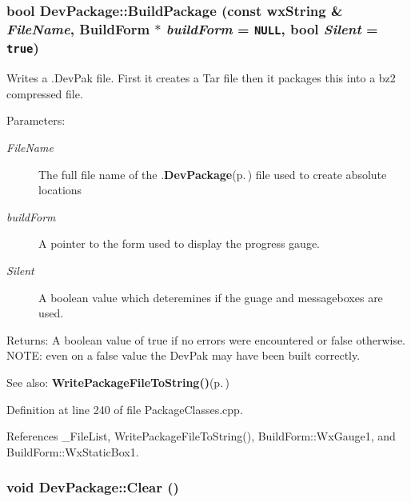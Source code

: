 \subsubsection{\setlength{\rightskip}{0pt plus 5cm}bool Dev\-Package::Build\-Package (const wx\-String \& {\em File\-Name}, {\bf Build\-Form} $\ast$ {\em build\-Form} = {\tt NULL}, bool {\em Silent} = {\tt true})}\label{class_dev_package_1fe849358b234bf36802aa17c9b5a165}


Writes a .Dev\-Pak file. First it creates a Tar file then it packages this into a bz2 compressed file. \begin{Desc}
\item[Parameters:]
\begin{description}
\item[{\em File\-Name}]The full file name of the .{\bf Dev\-Package}{\rm (p.\,\pageref{class_dev_package})} file used to create absolute locations \item[{\em build\-Form}]A pointer to the form used to display the progress gauge. \item[{\em Silent}]A boolean value which deteremines if the guage and messageboxes are used. \end{description}
\end{Desc}
\begin{Desc}
\item[Returns:]A boolean value of true if no errors were encountered or false otherwise. NOTE: even on a false value the Dev\-Pak may have been built correctly. \end{Desc}
\begin{Desc}
\item[See also:]{\bf Write\-Package\-File\-To\-String()}{\rm (p.\,\pageref{class_dev_package_582087a094b37723a308a80610a94c5a})} \end{Desc}


Definition at line 240 of file Package\-Classes.cpp.

References \_\-File\-List, Write\-Package\-File\-To\-String(), Build\-Form::Wx\-Gauge1, and Build\-Form::Wx\-Static\-Box1.
\subsubsection{\setlength{\rightskip}{0pt plus 5cm}void Dev\-Package::Clear ()\hspace{0.3cm}{\tt  [inline]}}\label{class_dev_package_9c7c89cacc4fa0db700e3a550d4b809d}


